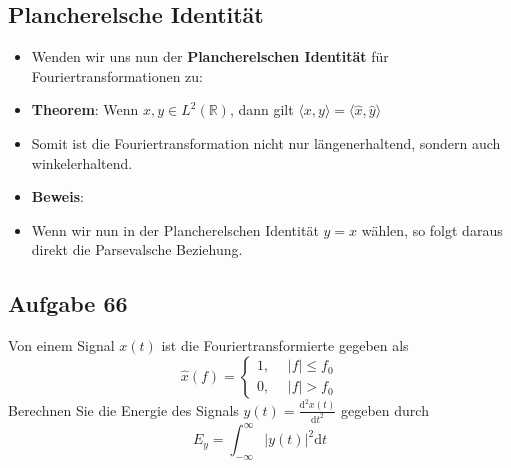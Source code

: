 \documentclass[11pt]{article}
\begin{document}
\subsection*{Plancherelsche Identität}
\vspace*{-0.5cm}
\begin{itemize}[leftmargin=0pt]
    \item[] Wenden wir uns nun der \textbf{Plancherelschen Identität} für Fouriertransformationen zu:
    \item[] \textbf{Theorem}: Wenn $x,y \in L^2(\mathbb{R})$, dann gilt $\langle x, y\rangle = \langle \hat{x}, \hat{y}\rangle$
    \item[] Somit ist die Fouriertransformation nicht nur längenerhaltend, sondern auch winkelerhaltend.
    \item[] \textbf{Beweis}:
\end{itemize}
\vspace*{-0.5cm}
\vspace*{-0.5cm}
\begin{itemize}[leftmargin=0pt]
    \item[] Wenn wir nun in der Plancherelschen Identität $y = x$ wählen, so folgt daraus direkt die Parsevalsche Beziehung.
\end{itemize}

\pagebreak

\subsection*{Aufgabe 66}
\vspace*{-0.5cm}
Von einem Signal $x(t)$ ist die Fouriertransformierte gegeben als 
$$\hat{x}(f) = \begin{cases}
    1, \hspace{15pt} |f| \leq f_0\\
    0, \hspace{15pt} |f| > f_0
\end{cases}$$
Berechnen Sie die Energie des Signals $y(t) = \displaystyle\frac{\text{d}^2x(t)}{\text{d}t^2}$ gegeben durch
$$E_y = \int_{-\infty}^\infty |y(t)|^2 \text{d}t$$

\end{document}
